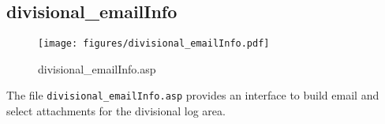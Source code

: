 \subsection{divisional\_emailInfo}
\begin{figure}[htb]
    \begin{center}
        \texttt{[image: figures/divisional\_emailInfo.pdf]}
    \end{center}
    \caption{divisional\_emailInfo.asp}
    \label{fig:divisional_emailInfo}
\end{figure}

The file \verb|divisional_emailInfo.asp| provides an interface to build email
and select attachments for the divisional log area.
